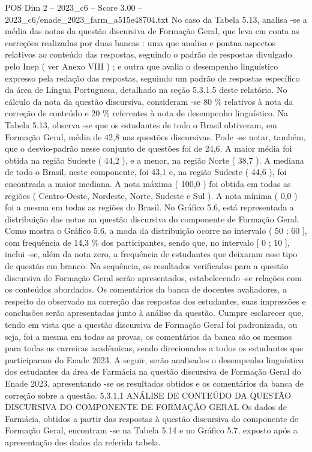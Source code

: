 \begin{textsample}{POS Dim 2 – 2023\_c6 – Score 3.00 – 2023\_c6/enade\_2023\_farm\_a515e48704.txt}
No caso da Tabela 5.13, analisa -se a média das notas da questão discursiva de Formação Geral, que leva em conta as correções realizadas por duas bancas : uma que analisa e pontua aspectos relativos ao conteúdo das respostas, seguindo o padrão de respostas divulgado pelo Inep ( ver Anexo VIII ) ; e outra que avalia o desempenho linguístico expresso pela redação das respostas, seguindo um padrão de respostas específico da área de Língua Portuguesa, detalhado na seção 5.3.1.5 deste relatório.
No cálculo da nota da questão discursiva, consideram -se 80 \% relativos à nota da correção de conteúdo e 20 \% referentes à nota de desempenho linguístico.
Na Tabela 5.13, observa -se que os estudantes de todo o Brasil obtiveram, em Formação Geral, média de 42,8 nas questões discursivas.
Pode -se notar, também, que o desvio-padrão nesse conjunto de questões foi de 24,6.
A maior média foi obtida na região Sudeste ( 44,2 ), e a menor, na região Norte ( 38,7 ).
A mediana de todo o Brasil, neste componente, foi 43,1 e, na região Sudeste ( 44,6 ), foi encontrada a maior mediana.
A nota máxima ( 100,0 ) foi obtida em todas as regiões ( Centro-Oeste, Nordeste, Norte, Sudeste e Sul ).
A nota mínima ( 0,0 ) foi a mesma em todas as regiões do Brasil.
No Gráfico 5.6, está representada a distribuição das notas na questão discursiva do componente de Formação Geral.
Como mostra o Gráfico 5.6, a moda da distribuição ocorre no intervalo ( 50 ; 60 ], com frequência de 14,3 \% dos participantes, sendo que, no intervalo [ 0 ; 10 ], inclui -se, além da nota zero, a frequência de estudantes que deixaram esse tipo de questão em branco.
Na sequência, os resultados verificados para a questão discursiva de Formação Geral serão apresentados, estabelecendo -se relações com os conteúdos abordados.
Os comentários da banca de docentes avaliadores, a respeito do observado na correção das respostas dos estudantes, suas impressões e conclusões serão apresentadas junto à análise da questão.
Cumpre esclarecer que, tendo em vista que a questão discursiva de Formação Geral foi padronizada, ou seja, foi a mesma em todas as provas, os comentários da banca são os mesmos para todas as carreiras acadêmicas, sendo direcionados a todos os estudantes que participaram do Enade 2023.
A seguir, serão analisados o desempenho linguístico dos estudantes da área de Farmácia na questão discursiva de Formação Geral do Enade 2023, apresentando -se os resultados obtidos e os comentários da banca de correção sobre a questão. 5.3.1.1 ANÁLISE DE CONTEÚDO DA QUESTÃO DISCURSIVA DO COMPONENTE DE FORMAÇÃO GERAL Os dados de Farmácia, obtidos a partir das respostas à questão discursiva do componente de Formação Geral, encontram -se na Tabela 5.14 e no Gráfico 5.7, exposto após a apresentação dos dados da referida tabela.

\end{textsample}

